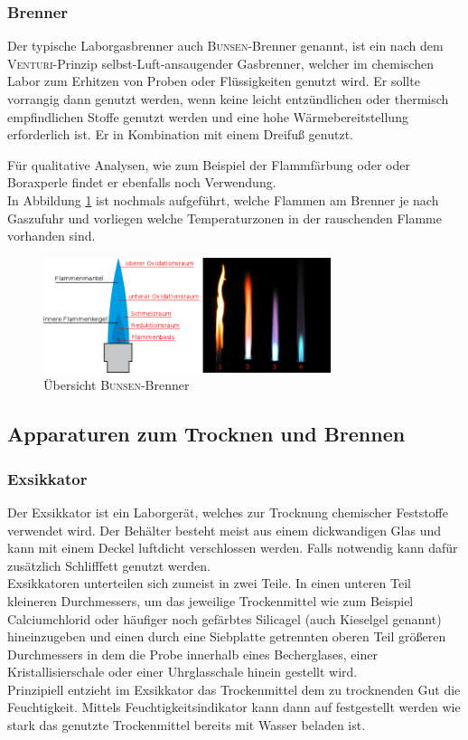 \subsubsection*{Brenner}
Der typische Laborgasbrenner auch \textsc{Bunsen}-Brenner genannt, ist ein nach dem \textsc{Venturi}-Prinzip selbst-Luft-ansaugender Gasbrenner, welcher im chemischen Labor zum Erhitzen von Proben oder Flüssigkeiten genutzt wird.  Er sollte vorrangig dann genutzt werden, wenn keine leicht entzündlichen oder thermisch empfindlichen Stoffe genutzt werden und eine hohe Wärmebereitstellung erforderlich ist. Er in Kombination mit einem Dreifuß genutzt.

\newpage
Für qualitative Analysen, wie zum Beispiel der Flammfärbung oder oder Boraxperle findet er ebenfalls noch Verwendung.\\
In Abbildung \ref{fig:brenner} ist nochmals aufgeführt, welche Flammen am Brenner je nach Gaszufuhr und vorliegen welche Temperaturzonen in der rauschenden Flamme vorhanden sind.\\

\begin{figure}[h!]
	\centering
	\includegraphics[width=0.75\textwidth]{img/brennerflamme3}
	\caption{Übersicht \textsc{Bunsen}-Brenner}
	\label{fig:brenner}
\end{figure}
\FloatBarrier

\subsection{Apparaturen zum Trocknen und Brennen}
\subsubsection*{Exsikkator}
Der Exsikkator ist ein Laborgerät, welches zur Trocknung chemischer Feststoffe verwendet wird. Der Behälter besteht meist aus einem dickwandigen Glas und kann mit einem Deckel luftdicht verschlossen werden. Falls notwendig kann dafür zusätzlich Schlifffett genutzt werden.\\
Exsikkatoren unterteilen sich zumeist in zwei Teile. In einen unteren Teil kleineren Durchmessers, um das jeweilige Trockenmittel wie zum Beispiel Calciumchlorid oder häufiger noch gefärbtes Silicagel (auch Kieselgel genannt) hineinzugeben und einen durch eine Siebplatte getrennten oberen Teil größeren Durchmessers in dem die Probe innerhalb eines Becherglases, einer Kristallisierschale oder einer Uhrglasschale hinein gestellt wird.\\
Prinzipiell entzieht im Exsikkator das Trockenmittel dem zu trocknenden Gut die Feuchtigkeit. Mittels Feuchtigkeitsindikator kann dann auf festgestellt werden wie stark das genutzte Trockenmittel bereits mit Wasser beladen ist.\\ 

